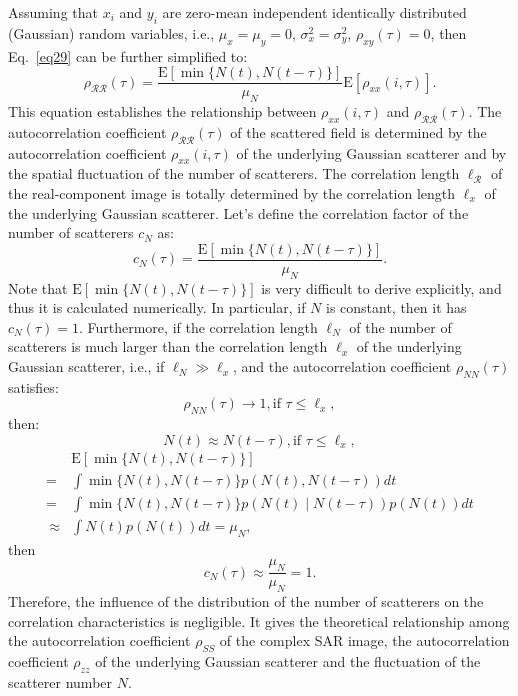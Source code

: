 \documentclass[journal]{IEEEtran}
\begin{document}
Assuming that $x_i$ and $y_i$ are zero-mean independent identically distributed (Gaussian) random variables, i.e.,
$\mu_x  = \mu_y = 0$, $\sigma_{x}^{2} = \sigma_{y}^{2}$,
$\rho_{x y}(\tau) = 0$, then Eq.~\eqref{eq29} can be further simplified to:
\begin{equation}
\rho_{\mathcal{R} \mathcal{R}}(\tau)=\frac{\mathrm{E}[\min \{N(t), N(t-\tau)\}]}{\mu_{N}} \mathrm{E}\left[\rho_{x x}(i, \tau)\right].
\label{eq30}
\end{equation}
This equation establishes the relationship between $\rho_{x x}(i, \tau)$ and $\rho_{\mathcal{R} \mathcal{R}}(\tau)$.
The autocorrelation coefficient $\rho_{\mathcal{R} \mathcal{R}}(\tau)$ of the scattered field is determined by the autocorrelation coefficient $\rho_{x x}(i, \tau)$ of the underlying Gaussian scatterer and by the spatial fluctuation of the number of scatterers.
The correlation length $\ell_\mathcal{R}$ of the real-component image is totally determined by the correlation length $\ell_x$ of the underlying Gaussian scatterer.
Let’s define the correlation factor of the number of scatterers $c_N$ as:
\begin{equation}
c_{N}(\tau) = \frac{\mathrm{E}[\min \{N(t), N(t-\tau)\}]}{\mu_{N}}.
\label{eq31}
\end{equation}
Note that $\mathrm{E}[\min \{N(t), N(t-\tau)\}]$ is very difficult to derive explicitly, and thus it is calculated numerically.
In particular, if $N$ is constant, then it has $c_{N}(\tau) = 1$.
Furthermore, if the correlation length $\ell_N$ of the number of scatterers is much larger than the correlation length $\ell_x$ of the underlying Gaussian scatterer, i.e., if $\ell_{N} \gg \ell_x$, and the autocorrelation coefficient $\rho_{N N}(\tau)$ satisfies:
\begin{equation}
\rho_{N N}(\tau) \rightarrow 1, \text{if } \tau \leq \ell_{x},
\label{eq32}
\end{equation}
then:
\begin{equation}
N(t) \approx N(t-\tau), \text{if } \tau \leq \ell_{x},
\label{eq33}
\end{equation}
\begin{align}
& \mathrm{E}[\min \{N(t), N(t-\tau)\}] \nonumber \\
={} & \int \min \{N(t), N(t-\tau)\} p(N(t), N(t-\tau)) d t  \nonumber \\
={} & \int \min \{N(t), N(t-\tau)\} p(N(t)\mid N(t-\tau)) p(N(t)) d t \nonumber \\\
\approx {} & \int N(t) p(N(t)) d t
= \mu_{N},
\label{eq34}
\end{align}
then
\begin{equation}
c_{N}(\tau) \approx \frac{\mu_{N}}{\mu_{N}} = 1.
\label{eq35}
\end{equation}
Therefore, the influence of the distribution of the number of scatterers on the correlation characteristics is negligible.
It gives the theoretical relationship among the autocorrelation coefficient $\rho_{S S}$ of the complex SAR image, the autocorrelation coefficient $\rho_{z z}$ of the underlying Gaussian scatterer and the fluctuation of the scatterer number $N$.
\end{document}
